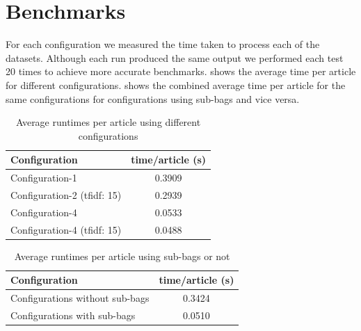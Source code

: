 \section{Benchmarks}
For each configuration we measured the time taken to process each of the datasets. Although each run produced the same output we performed each test 20 times to achieve more accurate benchmarks.  shows the average time per article for different configurations.  shows the combined average time per article for the same configurations for configurations using sub-bags and vice versa.

\begin{center}
  \begin{table}[ht]
  \begin{tabular}{|l|c|}
    \hline
    Configuration & time/article (s)  \\ \hline
    Configuration-1                     & 0.3909 \\ \hline
    Configuration-2 (tfidf: 15)         & 0.2939 \\ \hline
    Configuration-4                     & 0.0533 \\ \hline
    Configuration-4 (tfidf: 15)         & 0.0488 \\ \hline
  \end{tabular}
  \caption{Average runtimes per article using different configurations}
  \label{tab:benchmark1}
\end{table}
\end{center}

\begin{center}
  \begin{table}[ht]
  \begin{tabular}{|l|c|}
    \hline
    Configuration & time/article (s)             \\ \hline
    Configurations without sub-bags     & 0.3424 \\ \hline
    Configurations with sub-bags        & 0.0510 \\ \hline
  \end{tabular}
  \caption{Average runtimes per article using sub-bags or not}
  \label{tab:benchmark2}
\end{table}
\end{center}
